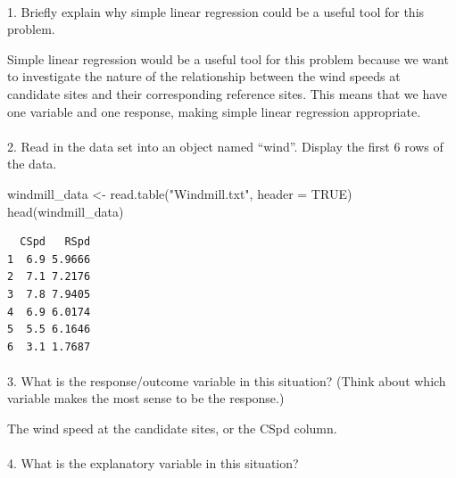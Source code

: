 \documentclass[
  letterpaper,
  DIV=11,
  numbers=noendperiod]{scrartcl}
\makeatletter
\let\oldparagraph\paragraph
\renewcommand{\paragraph}{
    \@ifstar
      \xxxParagraphStar
      \xxxParagraphNoStar
  }
\newcommand{\xxxParagraphStar}[1]{\oldparagraph*{#1}\mbox{}}
\newcommand{\xxxParagraphNoStar}[1]{\oldparagraph{#1}\mbox{}}
\newenvironment{Shaded}{\begin{snugshade}}{\end{snugshade}}
\newcommand{\AttributeTok}[1]{\textcolor[rgb]{0.40,0.45,0.13}{#1}}
\newcommand{\ConstantTok}[1]{\textcolor[rgb]{0.56,0.35,0.01}{#1}}
\newcommand{\FunctionTok}[1]{\textcolor[rgb]{0.28,0.35,0.67}{#1}}
\newcommand{\NormalTok}[1]{\textcolor[rgb]{0.00,0.23,0.31}{#1}}
\newcommand{\OtherTok}[1]{\textcolor[rgb]{0.00,0.23,0.31}{#1}}
\newcommand{\StringTok}[1]{\textcolor[rgb]{0.13,0.47,0.30}{#1}}
\makeatother
\begin{document}
\paragraph{1. Briefly explain why simple linear regression could be a
useful tool for this
problem.}\label{briefly-explain-why-simple-linear-regression-could-be-a-useful-tool-for-this-problem.}

Simple linear regression would be a useful tool for this problem because
we want to investigate the nature of the relationship between the wind
speeds at candidate sites and their corresponding reference sites. This
means that we have one variable and one response, making simple linear
regression appropriate.

\paragraph{2. Read in the data set into an object named ``wind''.
Display the first 6 rows of the
data.}\label{read-in-the-data-set-into-an-object-named-wind.-display-the-first-6-rows-of-the-data.}

\begin{Shaded}
\begin{Highlighting}[]
\NormalTok{windmill\_data }\OtherTok{\textless{}{-}} \FunctionTok{read.table}\NormalTok{(}\StringTok{"Windmill.txt"}\NormalTok{, }\AttributeTok{header =} \ConstantTok{TRUE}\NormalTok{)}
\FunctionTok{head}\NormalTok{(windmill\_data)}
\end{Highlighting}
\end{Shaded}

\begin{verbatim}
  CSpd   RSpd
1  6.9 5.9666
2  7.1 7.2176
3  7.8 7.9405
4  6.9 6.0174
5  5.5 6.1646
6  3.1 1.7687
\end{verbatim}

\paragraph{3. What is the response/outcome variable in this situation?
(Think about which variable makes the most sense to be the
response.)}\label{what-is-the-responseoutcome-variable-in-this-situation-think-about-which-variable-makes-the-most-sense-to-be-the-response.}

The wind speed at the candidate sites, or the CSpd column.

\paragraph{4. What is the explanatory variable in this
situation?}\label{what-is-the-explanatory-variable-in-this-situation}
\end{document}
